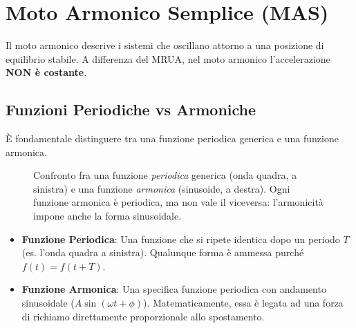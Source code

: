 \section{Moto Armonico Semplice (MAS)}

Il moto armonico descrive i sistemi che oscillano attorno a una posizione di equilibrio stabile. A differenza del MRUA, nel moto armonico l'accelerazione \textbf{NON è costante}.

\subsection{Funzioni Periodiche vs Armoniche}
È fondamentale distinguere tra una funzione periodica generica e una funzione armonica.

\begin{figure}[ht]
    \centering
    \begin{minipage}{0.48\textwidth}
        \centering
    \end{minipage}
    \hfill
    \begin{minipage}{0.48\textwidth}
        \centering
    \end{minipage}
    \caption{Confronto fra una funzione \emph{periodica} generica (onda quadra, a sinistra) e una funzione \emph{armonica} (sinusoide, a destra). Ogni funzione armonica è periodica, ma non vale il viceversa: l'armonicità impone anche la forma sinusoidale.}
    \label{fig:periodica_vs_armonica}
\end{figure}

\begin{itemize}
    \item \textbf{Funzione Periodica}: Una funzione che si ripete identica dopo un periodo $T$ (es. l'onda quadra a sinistra). Qualunque forma è ammessa purché $f(t) = f(t+T)$.
    \item \textbf{Funzione Armonica}: Una specifica funzione periodica con andamento sinusoidale ($A\sin(\omega t + \phi)$). Matematicamente, essa è legata ad una forza di richiamo direttamente proporzionale allo spostamento.
\end{itemize}

